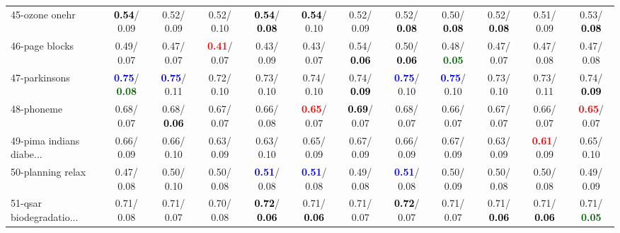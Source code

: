 \begin{table}[h]
\begin{center}
{\begin{tabular}{lc|c|c|c|c|c|c|c|c|c|c}
45-ozone onehr & \textcolor{black}{\textbf{  0.54}}/  0.09 &   0.52/  0.09 &   0.52/  0.10 & \textcolor{black}{\textbf{  0.54}}/\textcolor{black}{\textbf{  0.08}} & \textcolor{black}{\textbf{  0.54}}/  0.10 &   0.52/  0.09 &   0.52/\textcolor{black}{\textbf{  0.08}} &   0.50/\textcolor{black}{\textbf{  0.08}} &   0.52/\textcolor{black}{\textbf{  0.08}} &   0.51/  0.09 &   0.53/\textcolor{black}{\textbf{  0.08}} \\
46-page blocks &   0.49/  0.07 &   0.47/  0.07 & \textcolor{red}{\textbf{  0.41}}/  0.07 &   0.43/  0.09 &   0.43/  0.07 &   0.54/\textcolor{black}{\textbf{  0.06}} &   0.50/\textcolor{black}{\textbf{  0.06}} &   0.48/\textcolor{darkgreen}{\textbf{  0.05}} &   0.47/  0.07 &   0.47/  0.08 &   0.47/  0.08 \\ \hline
47-parkinsons & \textcolor{blue}{\textbf{  0.75}}/\textcolor{darkgreen}{\textbf{  0.08}} & \textcolor{blue}{\textbf{  0.75}}/  0.11 &   0.72/  0.10 &   0.73/  0.10 &   0.74/  0.10 &   0.74/\textcolor{black}{\textbf{  0.09}} & \textcolor{blue}{\textbf{  0.75}}/  0.10 & \textcolor{blue}{\textbf{  0.75}}/  0.10 &   0.73/  0.10 &   0.73/  0.11 &   0.74/\textcolor{black}{\textbf{  0.09}} \\
48-phoneme &   0.68/  0.07 &   0.68/\textcolor{black}{\textbf{  0.06}} &   0.67/  0.07 &   0.66/  0.08 & \textcolor{red}{\textbf{  0.65}}/  0.07 & \textcolor{black}{\textbf{  0.69}}/  0.07 &   0.68/  0.07 &   0.66/  0.07 &   0.67/  0.07 &   0.66/  0.07 & \textcolor{red}{\textbf{  0.65}}/  0.07 \\
49-pima indians diabe... &   0.66/  0.09 &   0.66/  0.10 &   0.63/  0.09 &   0.63/  0.10 &   0.65/  0.09 &   0.67/  0.09 &   0.66/  0.09 &   0.67/  0.09 &   0.63/  0.09 & \textcolor{red}{\textbf{  0.61}}/  0.09 &   0.65/  0.10 \\
50-planning relax &   0.47/  0.08 &   0.50/  0.10 &   0.50/  0.08 & \textcolor{blue}{\textbf{  0.51}}/  0.08 & \textcolor{blue}{\textbf{  0.51}}/  0.08 &   0.49/  0.08 & \textcolor{blue}{\textbf{  0.51}}/  0.08 &   0.50/  0.09 &   0.50/  0.08 &   0.50/  0.08 &   0.49/  0.09 \\
51-qsar biodegradatio... &   0.71/  0.08 &   0.71/  0.07 &   0.70/  0.08 & \textcolor{black}{\textbf{  0.72}}/\textcolor{black}{\textbf{  0.06}} &   0.71/\textcolor{black}{\textbf{  0.06}} &   0.71/  0.07 & \textcolor{black}{\textbf{  0.72}}/  0.07 &   0.71/  0.07 &   0.71/\textcolor{black}{\textbf{  0.06}} &   0.71/\textcolor{black}{\textbf{  0.06}} &   0.71/\textcolor{darkgreen}{\textbf{  0.05}} \\

\end{tabular}}
\end{center}
\end{table}
